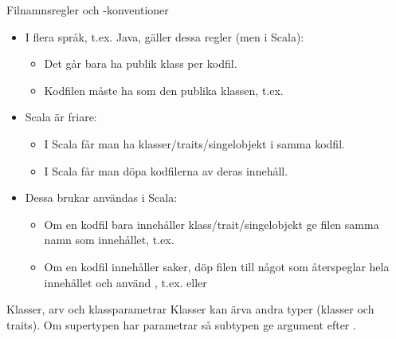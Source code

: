 \begin{Slide}{Filnamnsregler och -konventioner}\SlideFontSmall
\begin{itemize}
\item I flera språk, t.ex. Java, gäller dessa regler (men  i Scala):
\begin{itemize}\SlideFontTiny
\item Det går bara ha  publik klass per kodfil.
\item Kodfilen måste ha  som den publika klassen, t.ex. 
\end{itemize}
\item Scala är friare:
\begin{itemize}\SlideFontTiny
\item I Scala får man ha  klasser/traits/singelobjekt i samma kodfil.
\item I Scala får man döpa kodfilerna  av deras innehåll. \pause 
\end{itemize}

\item Dessa  brukar användas i Scala:
\begin{itemize}\SlideFontTiny
\item Om en kodfil bara innehåller  klass/trait/singelobjekt ge filen samma namn som innehållet, t.ex. 
\item Om en kodfil innehåller  saker, döp filen till något som återspeglar hela innehållet och använd , t.ex.  eller 
\end{itemize}
\end{itemize}
\end{Slide}


\begin{Slide}{Klasser, arv och klassparametrar}\SlideFontTiny
Klasser kan ärva andra typer (klasser och traits). Om supertypen har parametrar så  subtypen ge argument efter .

\ifkompendium
{}
\else
{}
\fi 
\end{Slide}


